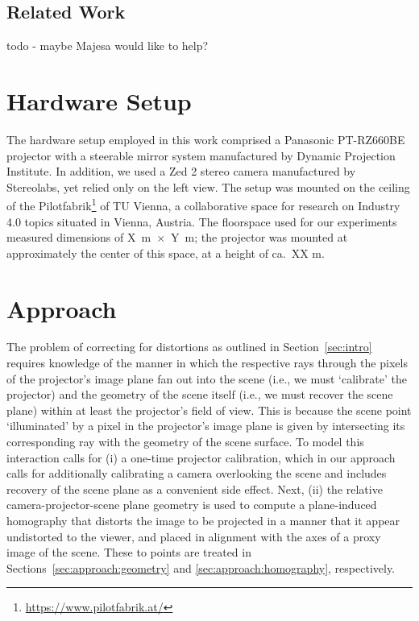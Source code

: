 \documentclass[review]{elsarticle}
\begin{document}
\subsection{Related Work}

todo - maybe Majesa would like to help?

\section{Hardware Setup}

The hardware setup employed in this work comprised a Panasonic PT-RZ660BE projector with a steerable mirror system manufactured by Dynamic Projection Institute. In addition, we used a Zed 2 stereo camera manufactured by Stereolabs, yet relied only on the left view. The setup was mounted on the ceiling of the Pilotfabrik\footnote{\url{https://www.pilotfabrik.at/}} of TU Vienna, a collaborative space for research on Industry 4.0 topics situated in Vienna, Austria. The floorspace used for our experiments measured dimensions of X~m~$\times$~Y~m; the projector was mounted at approximately the center of this space, at a height of ca.\ XX m. 

\section{Approach}

The problem of correcting for distortions as outlined in Section~\ref{sec:intro} requires knowledge of the manner in which the respective rays through the pixels of the projector's image plane fan out into the scene (i.e., we must `calibrate' the projector) and the geometry of the scene itself (i.e., we must recover the scene plane) within at least the projector's field of view. This is because the scene point `illuminated' by a pixel in the projector's image plane is given by intersecting its corresponding ray with the geometry of the scene surface. To model this interaction calls for (i) a one-time projector calibration, which in our approach calls for additionally calibrating a camera overlooking the scene and includes recovery of the scene plane as a convenient side effect. Next, (ii) the relative camera-projector-scene plane geometry is used to compute a plane-induced homography that distorts the image to be projected in a manner that it appear undistorted to the viewer, and placed in alignment with the axes of a proxy image of the scene. These to points are treated in Sections~\ref{sec:approach:geometry} and \ref{sec:approach:homography}, respectively.
\end{document}
